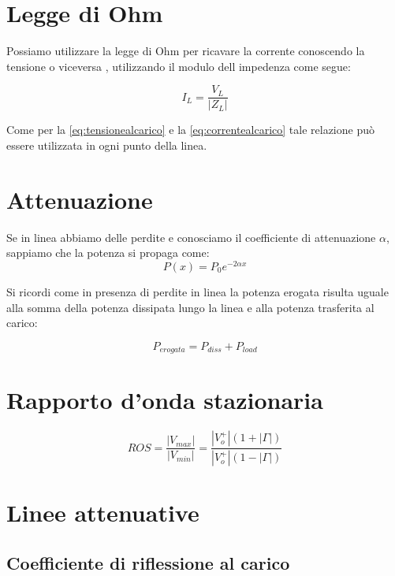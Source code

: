 	\section{Legge di Ohm}

	Possiamo utilizzare la legge di Ohm per ricavare la corrente conoscendo la tensione o viceversa , utilizzando il modulo dell impedenza come segue:

	\begin{equation}
	I_L=\frac{V_L}{|Z_L|}
	\end{equation}

			Come per la \ref{eq:tensionealcarico} e la \ref{eq:correntealcarico} tale relazione può essere utilizzata in ogni punto della linea.


	\section{Attenuazione}

		Se in linea abbiamo delle perdite e conosciamo il coefficiente di attenuazione $\alpha$, sappiamo che la potenza si propaga come:
		\begin{equation}
		P(x)=P_0e^{-2 \alpha x}
		\end{equation}

		Si ricordi come in presenza di perdite in linea la potenza erogata risulta uguale alla somma della potenza dissipata lungo la linea e alla potenza trasferita al carico:

		\begin{equation}
		P_{erogata}=P_{diss}+P_{load}
		\end{equation}

	\section{Rapporto d'onda stazionaria}

	\begin{equation}
	ROS=\frac{|V_{max}|}{|V_{min}|}=\frac{|V_o^+|(1+|\Gamma|)}{|V_o^+|(1-|\Gamma|)}
	\end{equation}

	\section{Linee attenuative}

		\subsection{Coefficiente di riflessione al carico}


